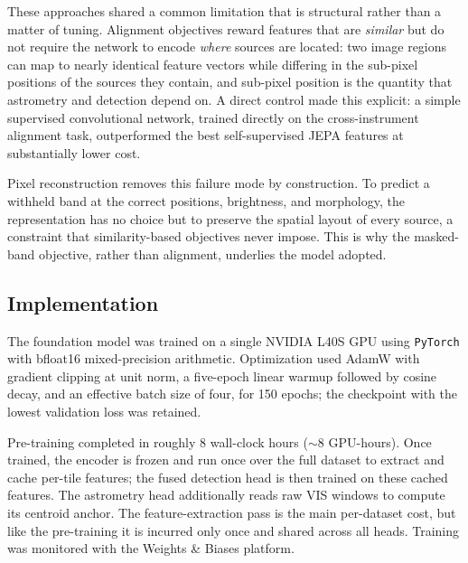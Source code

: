 \documentclass[twocolumn,linenumbers]{aastex701}
\begin{document}
These approaches shared a common limitation that is structural rather than a matter of tuning. Alignment objectives reward features that are \emph{similar} but do not require the network to encode \emph{where} sources are located: two image regions can map to nearly identical feature vectors while differing in the sub-pixel positions of the sources they contain, and sub-pixel position is the quantity that astrometry and detection depend on. A direct control made this explicit: a simple supervised convolutional network, trained directly on the cross-instrument alignment task, outperformed the best self-supervised JEPA features at substantially lower cost.

Pixel reconstruction removes this failure mode by construction. To predict a withheld band at the correct positions, brightness, and morphology, the representation has no choice but to preserve the spatial layout of every source, a constraint that similarity-based objectives never impose. This is why the masked-band objective, rather than alignment, underlies the model adopted.

\subsection{Implementation}\label{sec:code}

The foundation model was trained on a single NVIDIA L40S GPU using \texttt{PyTorch} \citep{pytorch} with bfloat16 mixed-precision arithmetic. Optimization used AdamW \citep{adamw} with gradient clipping at unit norm, a five-epoch linear warmup followed by cosine decay, and an effective batch size of four, for 150 epochs; the checkpoint with the lowest validation loss was retained.

Pre-training completed in roughly 8 wall-clock hours ($\sim$8 GPU-hours). Once trained, the encoder is frozen and run once over the full dataset to extract and cache per-tile features; the fused detection head is then trained on these cached features. The astrometry head additionally reads raw VIS windows to compute its centroid anchor. The feature-extraction pass is the main per-dataset cost, but like the pre-training it is incurred only once and shared across all heads. Training was monitored with the Weights \& Biases platform.
\end{document}

